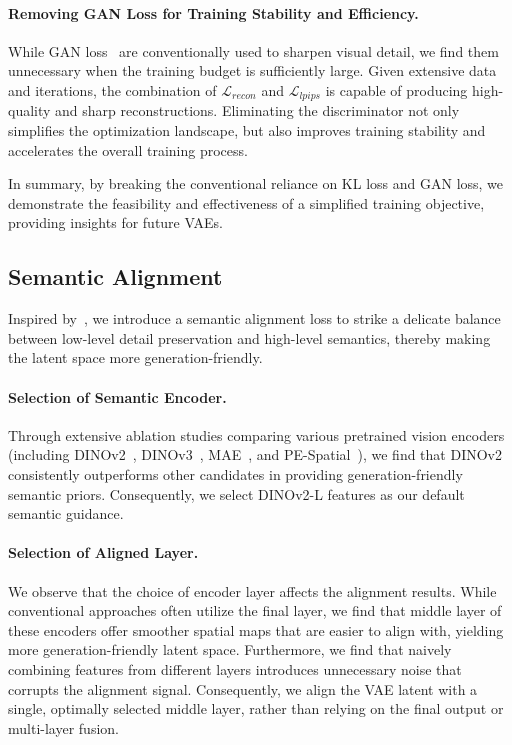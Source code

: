 \paragraph{Removing GAN Loss for Training Stability and Efficiency.} 
While GAN loss~\citep{gan} are conventionally used to sharpen visual detail, we find them unnecessary when the training budget is sufficiently large. Given extensive data and iterations, the combination of $\mathcal{L}_{recon}$ and $\mathcal{L}_{lpips}$ is capable of producing high-quality and sharp reconstructions. Eliminating the discriminator not only simplifies the optimization landscape, but also improves training stability and accelerates the overall training process.

In summary, by breaking the conventional reliance on KL loss and GAN loss, we demonstrate the feasibility and effectiveness of a simplified training objective, providing insights for future VAEs.

\subsection{Semantic Alignment}\label{sec:align}
Inspired by~\citet{vavae}, we introduce a semantic alignment loss to strike a delicate balance between low-level detail preservation and high-level semantics, thereby making the latent space more generation-friendly.

\paragraph{Selection of Semantic Encoder.}
Through extensive ablation studies comparing various pretrained vision encoders (including DINOv2~\citep{dinov2}, DINOv3~\citep{dinov3}, MAE~\citep{mae}, and PE-Spatial~\citep{bolya2025perception}), we find that DINOv2 consistently outperforms other candidates in providing generation-friendly semantic priors. Consequently, we select DINOv2-L features as our default semantic guidance.

\paragraph{Selection of Aligned Layer.}
We observe that the choice of encoder layer affects the alignment results. While conventional approaches often utilize the final layer, we find that middle layer of these encoders offer smoother spatial maps that are easier to align with, yielding more generation-friendly latent space. Furthermore, we find that naively combining features from different layers introduces unnecessary noise that corrupts the alignment signal. Consequently, we align the VAE latent with a single, optimally selected middle layer, rather than relying on the final output or multi-layer fusion.

